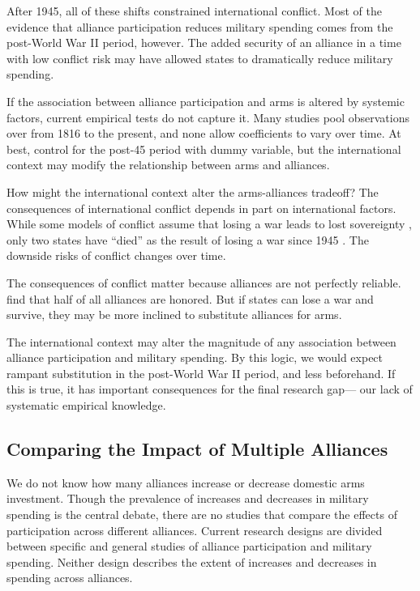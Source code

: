 \documentclass[12pt]{article}
\begin{document}
After 1945, all of these shifts constrained international conflict. 
Most of the evidence that alliance participation reduces military spending comes from the post-World War II period, however.  
The added security of an alliance in a time with low conflict risk may have allowed states to dramatically reduce military spending. 


If the association between alliance participation and arms is altered by systemic factors, current empirical tests do not capture it. 
Many studies pool observations over from 1816 to the present, and none allow coefficients to vary over time. 
At best, \citet{Horowitzetal2017} control for the post-45 period with dummy variable, but the international context may modify the relationship between arms and alliances. 


How might the international context alter the arms-alliances tradeoff?
The consequences of international conflict depends in part on international factors. 
While some models of conflict assume that losing a war leads to lost sovereignty \citep{Fearon2018}, only two states have ``died'' as the result of losing a war since 1945 \citep{Fazal2011}. 
The downside risks of conflict changes over time. 


The consequences of conflict matter because alliances are not perfectly reliable. 
\citet{BerkemeierFuhrmann2018} find that half of all alliances are honored. 
But if states can lose a war and survive, they may be more inclined to substitute alliances for arms. 


The international context may alter the magnitude of any association between alliance participation and military spending. 
By this logic, we would expect rampant substitution in the post-World War II period, and less beforehand. 
If this is true, it has important consequences for the final research gap--- our lack of systematic empirical knowledge. 



\subsection{Comparing the Impact of Multiple Alliances}


We do not know how many alliances increase or decrease domestic arms investment.
Though the prevalence of increases and decreases in military spending is the central debate, there are no studies that compare the effects of participation across different alliances. 
Current research designs are divided between specific and general studies of alliance participation and military spending.
Neither design describes the extent of increases and decreases in spending across alliances.  
\end{document}
